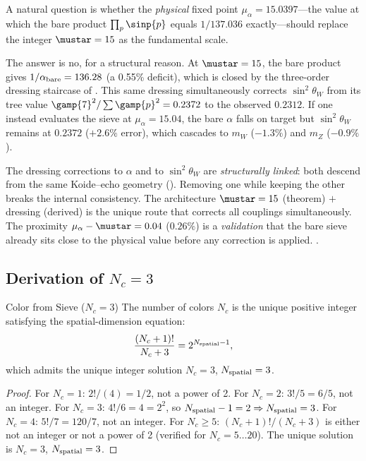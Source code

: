 \documentclass[12pt,a4paper]{article}
\begin{document}
\begin{remark}[Why $\mustar = 15$, not $\mu_\alpha = 15.04$]
\label{rem:mu15_vs_mualpha}
A natural question is whether the \emph{physical} fixed point
$\mu_\alpha = 15.0397$---the value at which the bare product
$\prod_p \sinp{p}$ equals $1/137.036$ exactly---should replace the
integer $\mustar = 15$ as the fundamental scale.

The answer is no, for a structural reason. At $\mustar = 15$, the
bare product gives $1/\alpha_{\rm bare} = 136.28$ (a 0.55\% deficit),
which is closed by the three-order dressing staircase of
\cite{companion_physics}. This same dressing simultaneously corrects
$\sin^2\!\theta_W$ from its tree value $\gamp{7}^2/\sum \gamp{p}^2
= 0.2372$ to the observed $0.2312$. If one instead evaluates the
sieve at $\mu_\alpha = 15.04$, the bare $\alpha$ falls on target
but $\sin^2\!\theta_W$ remains at $0.2372$ ($+2.6\%$ error), which
cascades to $m_W$ ($-1.3\%$) and $m_Z$ ($-0.9\%$).

The dressing corrections to $\alpha$ and to $\sin^2\!\theta_W$ are
\emph{structurally linked}: both descend from the same Koide--echo
geometry (\cite{companion_physics}). Removing one while keeping the
other breaks the internal consistency. The architecture
$\mustar = 15$ (theorem) $+$ dressing (derived) is the unique route
that corrects all couplings simultaneously. The proximity
$\mu_\alpha - \mustar = 0.04$ ($0.26\%$) is a \emph{validation} that
the bare sieve already sits close to the physical value before any
correction is applied. \VALTAG.
\end{remark}

\subsection{Derivation of \texorpdfstring{$N_c = 3$}{Nc=3}}
\label{sec:ch8_Nc}

\begin{thmbox}{Color from Sieve ($N_c = 3$)}
\label{thm:Nc}
The number of colors $N_c$ is the unique positive integer
satisfying the spatial-dimension equation:
\begin{equation}
  \frac{(N_c + 1)!}{N_c + 3} = 2^{N_{\rm spatial} - 1},
  \label{eq:Nc_equation:ch08}
\end{equation}
which admits the unique integer solution $N_c = 3$, $N_{\rm spatial} = 3$.

\begin{proof}
For $N_c = 1$: $2!/(4) = 1/2$, not a power of 2.
For $N_c = 2$: $3!/5 = 6/5$, not an integer.
For $N_c = 3$: $4!/6 = 4 = 2^2$, so $N_{\rm spatial} - 1 = 2 \Rightarrow N_{\rm spatial} = 3$.
For $N_c = 4$: $5!/7 = 120/7$, not an integer.
For $N_c \geq 5$: $(N_c + 1)!/(N_c + 3)$ is either not an integer
or not a power of 2 (verified for $N_c = 5\ldots 20$).
The unique solution is $N_c = 3$, $N_{\rm spatial} = 3$.
\end{proof}
\end{thmbox}
\end{document}
